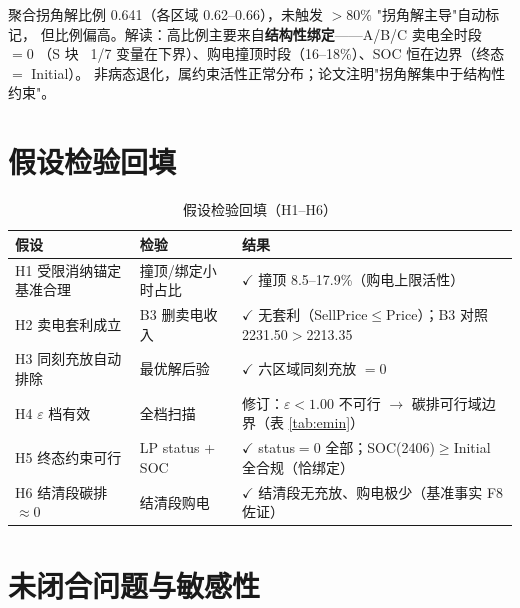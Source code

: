\documentclass{internal-report}
\begin{document}
聚合拐角解比例 0.641（各区域 0.62--0.66），未触发 $>80\%$ "拐角解主导"自动标记，
但比例偏高。解读：高比例主要来自\textbf{结构性绑定}——A/B/C 卖电全时段 $=0$
（S 块 ~1/7 变量在下界）、购电撞顶时段（16--18\%）、SOC 恒在边界（终态 $=$ Initial）。
非病态退化，属约束活性正常分布；论文注明"拐角解集中于结构性约束"。

\section{假设检验回填}

\begin{table}[h]
\centering
\footnotesize
\begin{tabular}{lll}
\toprule
假设 & 检验 & 结果 \\
\midrule
H1 受限消纳锚定基准合理 & 撞顶/绑定小时占比 & $\checkmark$ 撞顶 8.5--17.9\%（购电上限活性） \\
H2 卖电套利成立 & B3 删卖电收入 & $\checkmark$ 无套利（SellPrice$\le$Price）；B3 对照 2231.50$>$2213.35 \\
H3 同刻充放自动排除 & 最优解后验 & $\checkmark$ 六区域同刻充放 $=0$ \\
H4 $\varepsilon$ 档有效 & 全档扫描 & 修订：$\varepsilon<1.00$ 不可行 $\to$ 碳排可行域边界（表 \ref{tab:emin}） \\
H5 终态约束可行 & LP status + SOC & $\checkmark$ status$=0$ 全部；SOC(2406)$\ge$Initial 全合规（恰绑定） \\
H6 结清段碳排 $\approx 0$ & 结清段购电 & $\checkmark$ 结清段无充放、购电极少（基准事实 F8 佐证） \\
\bottomrule
\end{tabular}
\caption{假设检验回填（H1--H6）}
\label{tab:h}
\end{table}

\section{未闭合问题与敏感性}
\end{document}
